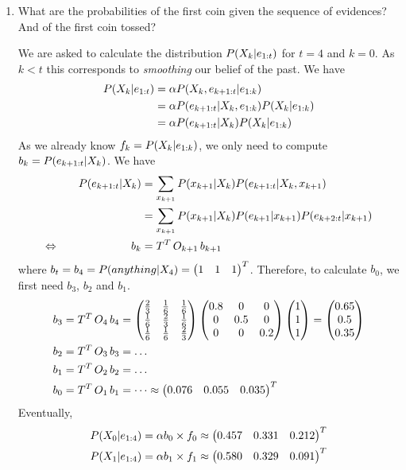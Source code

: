 \documentclass[11pt, a4paper]{article}
\begin{document}
\begin{enumerate}
    \item What are the probabilities of the first coin given the sequence of evidences? And of the first coin tossed?
    
    \begin{solution}
        We are asked to calculate the distribution $P(X_k \vert e_{1:t})$ for $t = 4$ and $k = 0$. As $k < t$ this corresponds to \emph{smoothing} our belief of the past. We have
        \begin{align*}
            P(X_k \vert e_{1:t}) & = \alpha P(X_k, e_{k + 1:t} \vert e_{1:k}) \\
            & = \alpha P(e_{k + 1:t} \vert X_k, e_{1:k}) P(X_k \vert e_{1:k}) \\
            & = \alpha P(e_{k + 1:t} \vert X_k) P(X_k \vert e_{1:k})
        \end{align*}
        As we already know $f_k = P(X_k \vert e_{1:k})$, we only need to compute $b_k = P(e_{k + 1:t} \vert X_k)$. We have
        \begin{alignat*}{2}
            && P(e_{k + 1:t} \vert X_k) & = \sum_{x_{k + 1}} P(x_{k + 1} \vert X_k) P(e_{k + 1:t} \vert X_k, x_{k + 1}) \\
            &&& = \sum_{x_{k + 1}} P(x_{k + 1} \vert X_k) P(e_{k + 1} \vert x_{k + 1}) P(e_{k + 2:t} \vert x_{k + 1}) \\
            \Leftrightarrow \quad && b_k & = T^T \, O_{k + 1} \, b_{k + 1}
        \end{alignat*}
        where $b_t = b_4 = P(anything \vert X_4) = \begin{pmatrix}1 & 1 & 1\end{pmatrix}^T$. Therefore, to calculate $b_0$, we first need $b_3$, $b_2$ and $b_1$.
        \begin{align*}
            b_3 & = T^T \, O_{4} \, b_4 = \begin{pmatrix}
                \frac{2}{3} & \frac{1}{6} & \frac{1}{6} \\
                \frac{1}{6} & \frac{2}{3} & \frac{1}{6} \\
                \frac{1}{6} & \frac{1}{6} & \frac{2}{3}
            \end{pmatrix} \begin{pmatrix}0.8 & 0 & 0 \\ 0 & 0.5 & 0 \\ 0 & 0 & 0.2\end{pmatrix} \begin{pmatrix}1 \\ 1 \\ 1\end{pmatrix} = \begin{pmatrix}0.65 \\ 0.5 \\ 0.35\end{pmatrix} \\
            b_2 & = T^T \, O_{3} \, b_3 = \dots \\
            b_1 & = T^T \, O_{2} \, b_2 = \dots \\
            b_0 & = T^T \, O_{1} \, b_1 = \dots \approx \begin{pmatrix}0.076 & 0.055 & 0.035\end{pmatrix}^T
        \end{align*}
        Eventually,
        \begin{align*}
            P(X_0 \vert e_{1:4}) & = \alpha b_0 \times f_0 \approx \begin{pmatrix}0.457 & 0.331 & 0.212\end{pmatrix}^T \\
            P(X_1 \vert e_{1:4}) & = \alpha b_1 \times f_1 \approx \begin{pmatrix}0.580 & 0.329 & 0.091\end{pmatrix}^T
        \end{align*}
    \end{solution}
    

\end{enumerate}
\end{document}
